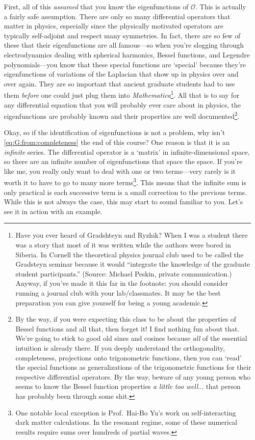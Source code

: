 First, all of this \emph{assumed} that you know the eigenfunctions of $\mathcal O$. This is actually a fairly safe assumption. There are only so many differential operators that matter in physics, especially since the physically motivated operators are typically self-adjoint and respect many symmetries. In fact, there are so few of these that their eigenfunctions are all famous---so when you're slogging through electrodynamics dealing with spherical harmonics, Bessel functions, and Legendre polynomials---you know that these special functions are `special' because they're eigenfunctions of variations of the Laplacian that show up in physics over and over again. They are so important that ancient graduate students had to use them \emph{before} one could just plug them into \emph{Mathematica}\footnote{Have you ever heard of Gradshteyn and Ryzhik? When I was a student there was a story that most of it was written while the authors were bored in Siberia. In Cornell the theoretical physics journal club used to be called the Gradsteyn seminar because it would ``integrate the knowledge of the graduate student participants.'' (Source: Michael Peskin, private communication.) Anyway, if you've made it this far in the footnote: you should consider running a journal club with your lab/classmates. It may be the best preparation you can give yourself for being a young academic.}. All that is to say for any differential equation that you will probably ever care about in physics, the eigenfunctions are probably known and their properties are well documented\footnote{By the way, if you were expecting this class to be about the properties of Bessel functions and all that, then forget it! I find nothing fun about that. We're going to stick to good old sines and cosines because \emph{all} of the essential intuition is already there. If you deeply understand the orthogonality, completeness, projections onto trigonometric functions, then you can `read' the special functions as generalizations of the trigonometric functions for their respective differential operators. By the way, beware of any young person who seems to know the Bessel function properties \emph{a little too well}... that person has probably been through some shit.}. 

Okay, so if the identification of eigenfunctions is not a problem, why isn't \eqref{eq:G:from:completeness} the end of this course? One reason is that it is an \emph{infinite} series. The differential operator is a `matrix' in  infinite-dimensional space, so there are an infinite number of eigenfunctions that space the space. If you're like me, you really only want to deal with one or two terms---very rarely is it worth it to have to go to many more terms\footnote{One notable local exception is Prof.~Hai-Bo Yu's work on self-interacting dark matter calculations. In the resonant regime, some of these numerical results require sums over hundreds of partial waves.}. This means that the infinite sum is only practical is each successive term is a small correction to the previous terms. While this is not always the case, this may start to sound familiar to you. Let's see it in action with an example.

